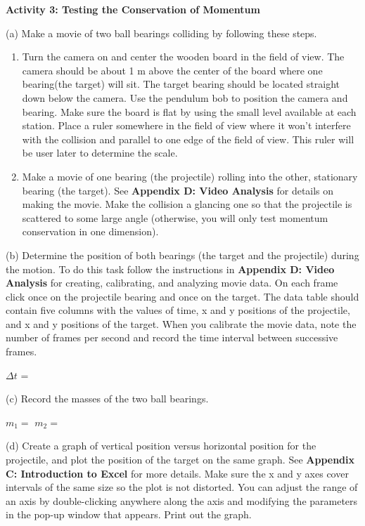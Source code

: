 \textbf{Activity 3: Testing the Conservation of Momentum }

(a) Make a movie of two ball bearings colliding by following these steps. 

\begin{enumerate}
\item Turn the camera on and center the wooden board in the field of view. The camera
should be about 1 m above the center of the board where one bearing(the target)
will sit. The target bearing should be located straight down below the camera.
Use the pendulum bob to position the camera and bearing. Make sure the board
is flat by using the small level available at each station. Place a ruler somewhere
in the field of view where it won't interfere with the collision and parallel
to one edge of the field of view. This ruler will be user later to determine
the scale. 
\item Make a movie of one bearing (the projectile) rolling into the other, stationary
bearing (the target). See \textbf{Appendix D: Video Analysis} for details on
making the movie. Make the collision a glancing one so that the projectile is
scattered to some large angle (otherwise, you will only test momentum conservation
in one dimension).
\end{enumerate}
(b) Determine the position of both bearings (the target and the projectile)
during the motion. To do this task follow the instructions in \textbf{Appendix
D: Video Analysis} for creating, calibrating, and analyzing movie data. On each
frame click once on the projectile bearing and once on the target. The data
table should contain five columns with the values of time, x and y positions
of the projectile, and x and y positions of the target. When you calibrate the
movie data, note the number of frames per second and record the time interval
between successive frames.
\vspace{5mm}

\( \Delta  t\) = 
\vspace{5mm}

(c) Record the masses of the two ball bearings.
\vspace{5mm}

\( m_{1} =\)  \hfill{}\( m_{2} =\)  \hfill{}
\vspace{5mm}

(d) Create a graph of vertical position versus horizontal position for the projectile, and plot the position of the target on the same graph.
See \textbf{Appendix C: Introduction to Excel} for more details. Make
sure the x and y axes cover intervals of the same size so the plot is not distorted.
You can adjust the range of an axis by double-clicking anywhere along the axis
and modifying the parameters in the pop-up window that appears. 
Print out the graph.

